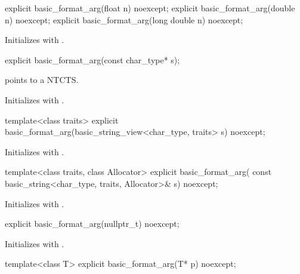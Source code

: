 \begin{itemdecl}
explicit basic_format_arg(float n) noexcept;
explicit basic_format_arg(double n) noexcept;
explicit basic_format_arg(long double n) noexcept;
\end{itemdecl}

\begin{itemdescr}
\pnum
\effects
Initializes  with .
\end{itemdescr}

\begin{itemdecl}
explicit basic_format_arg(const char_type* s);
\end{itemdecl}

\begin{itemdescr}
\pnum
\expects
{} points to a NTCTS.

\pnum
\effects
Initializes  with .
\end{itemdescr}

\begin{itemdecl}
template<class traits>
  explicit basic_format_arg(basic_string_view<char_type, traits> s) noexcept;
\end{itemdecl}

\begin{itemdescr}
\pnum
\effects
Initializes  with
.
\end{itemdescr}

\begin{itemdecl}
template<class traits, class Allocator>
  explicit basic_format_arg(
    const basic_string<char_type, traits, Allocator>& s) noexcept;
\end{itemdecl}

\begin{itemdescr}
\pnum
\effects
Initializes  with
.
\end{itemdescr}

\begin{itemdecl}
explicit basic_format_arg(nullptr_t) noexcept;
\end{itemdecl}

\begin{itemdescr}
\pnum
\effects
Initializes  with
  .
\end{itemdescr}

\begin{itemdecl}
template<class T> explicit basic_format_arg(T* p) noexcept;
\end{itemdecl}

